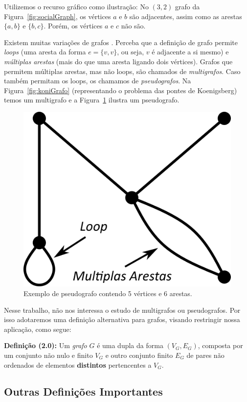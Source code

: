 \documentclass[a4paper,12pt]{article}
\begin{document}
Utilizemos o recurso gráfico como ilustração: No $(3,2)$ grafo da Figura~\ref{fig:socialGraph}, os vértices $a$ e $b$ são adjacentes, assim como as arestas $\{a, b\}$ e $\{b, c\}$. Porém, os vértices $a$ e $c$ não são.

Existem muitas variações de grafos \cite{graphTheoryFHarary}. Perceba que a definição de grafo permite \textit{loops} (uma aresta da forma $e = \{v,v\}$, ou seja, $v$ é adjacente a si mesmo) e \textit{múltiplas arestas} (mais do que uma aresta ligando dois vértices). Grafos que permitem múltiplas arestas, mas não loops, são chamados de \textit{multigrafos}. Caso também permitam os loops, os chamamos de \textit{pseudografos}. Na Figura~\ref{fig:koniGrafo} (representando o problema das pontes de Koenigsberg) temos um multigrafo e a Figura~\ref{fig:pseudograph} ilustra um pseudografo.

\begin{figure}[H]
	\begin{center}
		\includegraphics[width=0.28\linewidth]{figures/pseudograph.png}
	\end{center}
	\caption{Exemplo de pseudografo contendo 5 vértices e 6 arestas.}
	\label{fig:pseudograph}
\end{figure}

Nesse trabalho, não nos interessa o estudo de multigrafos ou pseudografos. Por isso adotaremos uma definição alternativa para grafos, visando restringir nossa aplicação, como segue:

\begin{center}
	\begin{minipage}{0.9 \linewidth}
		\textbf{Definição (2.0):} Um \textit{grafo} $G$ é uma dupla da forma $(V_G,E_G)$, composta por um conjunto não nulo e finito $V_G$ e outro conjunto finito $E_G$ de pares não ordenados de elementos \textbf{distintos} pertencentes a $V_G$.
	\end{minipage}
\end{center} 

\subsection{Outras Definições Importantes}
\end{document}

